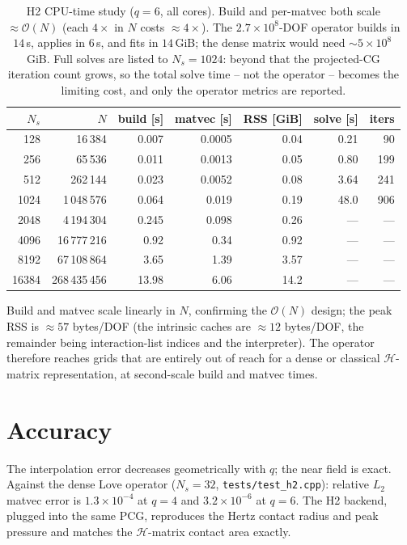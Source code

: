 \documentclass[11pt,a4paper]{article}
\newcommand{\Order}{\mathcal{O}}
\begin{document}
\begin{table}[h]
\centering
\begin{tabular}{rrrrrrr}
\toprule
$N_s$ & $N$ & build [s] & matvec [s] & RSS [GiB] & solve [s] & iters \\
\midrule
128   & 16\,384       & 0.007 & 0.0005 & 0.04 & 0.21  & 90 \\
256   & 65\,536       & 0.011 & 0.0013 & 0.05 & 0.80  & 199 \\
512   & 262\,144      & 0.023 & 0.0052 & 0.08 & 3.64  & 241 \\
1024  & 1\,048\,576   & 0.064 & 0.019  & 0.19 & 48.0  & 906 \\
2048  & 4\,194\,304   & 0.245 & 0.098  & 0.26 & ---   & --- \\
4096  & 16\,777\,216  & 0.92  & 0.34   & 0.92 & ---   & --- \\
8192  & 67\,108\,864  & 3.65  & 1.39   & 3.57 & ---   & --- \\
16384 & 268\,435\,456 & 13.98 & 6.06   & 14.2 & ---   & --- \\
\bottomrule
\end{tabular}
\caption{H2 CPU-time study ($q=6$, all cores). Build and per-matvec both scale
$\approx\Order(N)$ (each $4\times$ in $N$ costs $\approx4\times$). The
$2.7\times10^8$-DOF operator builds in $14$\,s, applies in $6$\,s, and fits in
$14$\,GiB; the dense matrix would need $\sim5\times10^{8}$\,GiB. Full solves
are listed to $N_s=1024$: beyond that the projected-CG iteration count grows,
so the total solve time -- not the operator -- becomes the limiting cost, and
only the operator metrics are reported.}
\label{tab:cputime}
\end{table}

Build and matvec scale linearly in $N$, confirming the $\Order(N)$ design; the
peak RSS is $\approx57$ bytes/DOF (the intrinsic caches are $\approx12$
bytes/DOF, the remainder being interaction-list indices and the interpreter).
The operator therefore reaches grids that are entirely out of reach for a
dense or classical $\mathcal{H}$-matrix representation, at second-scale build
and matvec times.

\section{Accuracy}

The interpolation error decreases geometrically with $q$; the near field is
exact. Against the dense Love operator ($N_s=32$, \texttt{tests/test\_h2.cpp}):
relative $L_2$ matvec error is $1.3\times10^{-4}$ at $q=4$ and
$3.2\times10^{-6}$ at $q=6$. The H2 backend, plugged into the same PCG,
reproduces the Hertz contact radius and peak pressure and matches the
$\mathcal{H}$-matrix contact area exactly.
\end{document}
